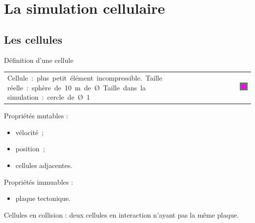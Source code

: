 \documentclass{beamer}
\begin{document}
\section{La simulation cellulaire}

\subsection{Les cellules}
\begin{frame}{Définition d'une cellule}
  \begin{tabular}{m{8cm}m{1cm}m{2cm}}
    \mbox{Cellule : plus petit élément incompressible. Taille}
    \mbox{réelle : sphère de 10 m de Ø Taille dans la}
    \mbox{simulation : cercle de Ø 1} &&
    \includegraphics[width=1.5cm]{Images/cellule.png}
  \end{tabular}
  Propriétés mutables :
  \begin{itemize}
   \item vélocité~;
   \item position~;
   \item cellules adjacentes.
  \end{itemize}
  Propriétés immuables :
  \begin{itemize}
   \item plaque tectonique.\\
  \end{itemize}
  \smallbreak
  Cellules en collision : deux cellules en interaction n'ayant pas la même plaque.
\end{frame}
\end{document}

